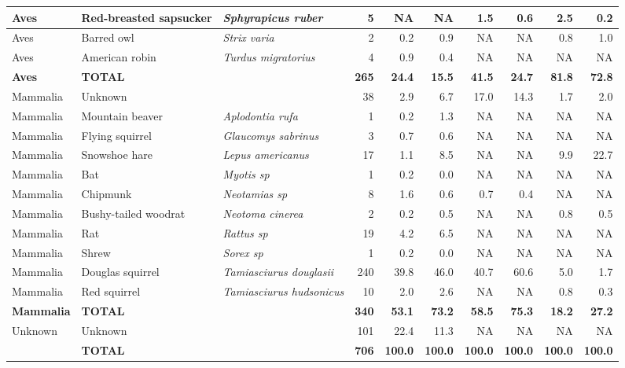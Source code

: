 \documentclass[
]{article}
\begin{document}
\begin{table}[H]
\begin{tabular}{l|l|>{\em}l|r|r|r|r|r|r|r}
\hline
Aves & Red-breasted sapsucker & Sphyrapicus ruber & 5 & NA & NA & 1.5 & 0.6 & 2.5 & 0.2\\
\hline
Aves & Barred owl & Strix varia & 2 & 0.2 & 0.9 & NA & NA & 0.8 & 1.0\\
\hline
Aves & American robin & Turdus migratorius & 4 & 0.9 & 0.4 & NA & NA & NA & NA\\
\hline
\textbf{Aves} & \textbf{TOTAL} & \textbf{} & \textbf{265} & \textbf{24.4} & \textbf{15.5} & \textbf{41.5} & \textbf{24.7} & \textbf{81.8} & \textbf{72.8}\\
\hline
Mammalia & Unknown &  & 38 & 2.9 & 6.7 & 17.0 & 14.3 & 1.7 & 2.0\\
\hline
Mammalia & Mountain beaver & Aplodontia rufa & 1 & 0.2 & 1.3 & NA & NA & NA & NA\\
\hline
Mammalia & Flying squirrel & Glaucomys sabrinus & 3 & 0.7 & 0.6 & NA & NA & NA & NA\\
\hline
Mammalia & Snowshoe hare & Lepus americanus & 17 & 1.1 & 8.5 & NA & NA & 9.9 & 22.7\\
\hline
Mammalia & Bat & Myotis sp & 1 & 0.2 & 0.0 & NA & NA & NA & NA\\
\hline
Mammalia & Chipmunk & Neotamias sp & 8 & 1.6 & 0.6 & 0.7 & 0.4 & NA & NA\\
\hline
Mammalia & Bushy-tailed woodrat & Neotoma cinerea & 2 & 0.2 & 0.5 & NA & NA & 0.8 & 0.5\\
\hline
Mammalia & Rat & Rattus sp & 19 & 4.2 & 6.5 & NA & NA & NA & NA\\
\hline
Mammalia & Shrew & Sorex sp & 1 & 0.2 & 0.0 & NA & NA & NA & NA\\
\hline
Mammalia & Douglas squirrel & Tamiasciurus douglasii & 240 & 39.8 & 46.0 & 40.7 & 60.6 & 5.0 & 1.7\\
\hline
Mammalia & Red squirrel & Tamiasciurus hudsonicus & 10 & 2.0 & 2.6 & NA & NA & 0.8 & 0.3\\
\hline
\textbf{Mammalia} & \textbf{TOTAL} & \textbf{} & \textbf{340} & \textbf{53.1} & \textbf{73.2} & \textbf{58.5} & \textbf{75.3} & \textbf{18.2} & \textbf{27.2}\\
\hline
Unknown & Unknown &  & 101 & 22.4 & 11.3 & NA & NA & NA & NA\\
\hline
\textbf{} & \textbf{TOTAL} & \textbf{} & \textbf{706} & \textbf{100.0} & \textbf{100.0} & \textbf{100.0} & \textbf{100.0} & \textbf{100.0} & \textbf{100.0}\\
\hline
\end{tabular}
\end{table}
\end{document}
